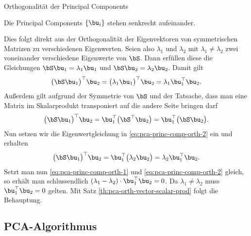 \begin{frame}{Orthogonalität der Principal Components}{}
	\begin{mytheo}
		Die Principal Components $\{ \bu_i \}$ stehen senkrecht aufeinander.
	\end{mytheo}

	\begin{myproof}
		Dies folgt direkt aus der Orthogonalität der Eigenvektoren von symmetrischen Matrizen zu verschiedenen Eigenwerten.
		Seien also $\lambda_1$ und $\lambda_2$ mit $\lambda_1 \ne \lambda_2$ zwei voneinander verschiedene Eigenwerte
		von $\bS$. Dann erfüllen diese die Gleichungen $\bS \bu_1 = \lambda_1 \bu_1$ und $\bS \bu_2 = \lambda_2 \bu_2$.
		Damit gilt
		\begin{equation} \label{eq:pca-princ-comp-orth-1}
			\bigl( \bS \bu_1 \bigr)^\top \bu_2
				= \bigl( \lambda_1 \bu_1 \bigr)^\top \bu_2
				= \lambda_1 \bu_1^\top \bu_2.
		\end{equation}
		Außerdem gilt aufgrund der Symmetrie von $\bS$ und der Tatsache, dass man eine Matrix im Skalarprodukt
		transponiert auf die andere Seite bringen darf
		\begin{equation} \label{eq:pca-princ-comp-orth-2}
			\bigl( \bS \bu_1 \bigr)^\top \bu_2
				= \bu_1^\top \bigl( \bS^\top \bu_2 \bigr)
				= \bu_1^\top \bigl( \bS \bu_2 \bigr).
		\end{equation}
		Nun setzen wir die Eigenwertgleichung in \eqref{eq:pca-princ-comp-orth-2} ein und erhalten
		\begin{equation} \label{eq:pca-princ-comp-orth-3}
			\bigl( \bS \bu_1 \bigr)^\top \bu_2
				= \bu_1^\top \bigl( \lambda_2 \bu_2 \bigr)
				= \lambda_2 \bu_1^\top \bu_2.
		\end{equation}
		Setzt man nun \eqref{eq:pca-princ-comp-orth-1} und \eqref{eq:pca-princ-comp-orth-2} gleich, so erhält man
		schlussendlich $(\lambda_1 - \lambda_2) \cdot \bu_1^\top \bu_2 = 0$. Da $\lambda_1 \ne \lambda_2$ muss
		$\bu_1^\top \bu_2 = 0$ gelten. Mit Satz \ref{th:pca-orth-vector-scalar-prod} folgt die Behauptung.
	\end{myproof}
\end{frame}


\subsection{PCA-Algorithmus}

